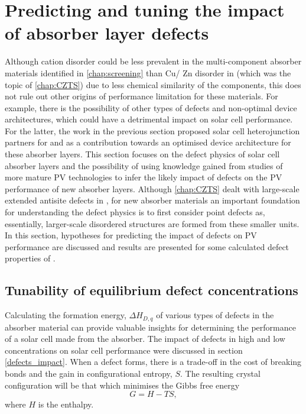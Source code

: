 \documentclass[11pt, twoside]{report}
\begin{document}
\section{Predicting and tuning the impact of absorber layer defects}\label{sulfosalt_defects}

Although cation disorder could be less prevalent in the multi-component absorber materials identified in \autoref{chap:screening} than Cu/ Zn disorder in {\CZTS} (which was the topic of \autoref{chap:CZTS}) due to less chemical similarity of the components, this does not rule out other origins of performance limitation for these materials. For example, there is the possibility of other types of defects and non-optimal device architectures, which could have a detrimental impact on solar cell performance. For the latter, the work in the previous section proposed solar cell heterojunction partners for {\enargite} and {\bournonite} as a contribution towards an optimised device architecture for these absorber layers. This section focuses on the defect physics of solar cell absorber layers and the possibility of using knowledge gained from studies of more mature PV technologies to infer the likely impact of defects on the PV performance of new absorber layers. Although \autoref{chap:CZTS} dealt with large-scale extended antisite defects in {\CZTS}, for new absorber materials an important foundation for understanding the defect physics is to first consider point defects as, essentially, larger-scale disordered structures are formed from these smaller units. In this section, hypotheses for predicting the impact of defects on PV performance are discussed and results are presented for some calculated defect properties of {\enargite}.

\subsection{Tunability of equilibrium defect concentrations}
Calculating the formation energy, $\Delta H_{D,q}$ of various types of defects in the absorber material can provide valuable insights for determining the performance of a solar cell made from the absorber. The impact of defects in high and low concentrations on solar cell performance were discussed in section \ref{defects_impact}. When a defect forms, there is a trade-off in the cost of breaking bonds and the gain in configurational entropy, $S$. The resulting crystal configuration will be that which minimises the Gibbs free energy
\begin{equation}\label{freeE}
G = H - TS,
\end{equation}
where $H$ is the enthalpy. 
\end{document}
